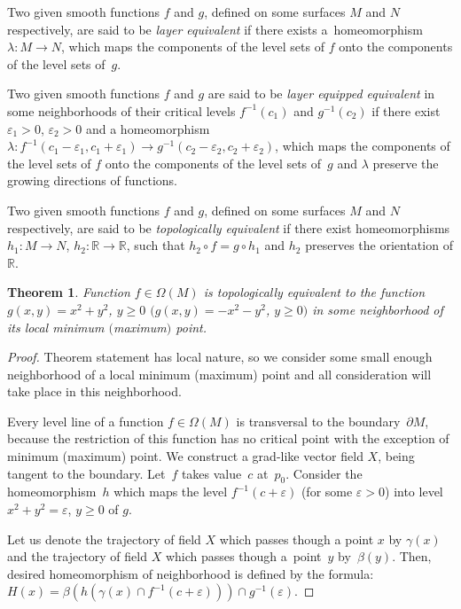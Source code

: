 \documentclass[pdftex]{sigma}
\numberwithin{equation}{section}
\newtheorem{Theorem}{Theorem}[section]
\begin{document}
\begin{Definition}\label{definition2.1}
Two given smooth functions $f$ and $g$, def\/ined on some surfaces $M$ and $N$ respectively, are said to be \emph{layer equivalent} if there exists a~homeomorphism $\lambda \colon M\rightarrow N$, which maps the components of the level sets of $f$ onto the components of the level sets of~$g$.
\end{Definition}

\begin{Definition}\label{definition2.2}
Two given smooth functions $f$ and $g$ are said to be \emph{layer equipped equivalent} in some neighborhoods of their critical levels $f^{-1}(c_{1})$ and $g^{-1}(c_{2})$ if there exist $\varepsilon_{1}>0$, $\varepsilon_{2}>0$ and a homeomorphism $\lambda \colon f^{-1}(c_{1}-\varepsilon_{1},c_{1}+\varepsilon_{1}) \rightarrow g^{-1}(c_{2}-\varepsilon_{2},c_{2}+\varepsilon_{2})$, which maps the components of the level sets of $f$ onto the components of the level sets of~$g$ and $\lambda$ preserve the growing directions of functions.
\end{Definition}

\begin{Definition}\label{definition2.3}
Two given smooth functions $f$ and $g$, def\/ined on some surfaces $M$ and $N$ respectively, are said to be \emph{topologically equivalent} if there exist homeomorphisms $h_1\colon M\rightarrow N$, $h_2\colon \mathbb{R}\rightarrow\mathbb{R}$, such that $h_2\circ f=g\circ h_1$ and $h_2$ preserves the orientation of $\mathbb{R}$.
\end{Definition}

\begin{Theorem}\label{theorem2.1}
Function $f\in\Omega(M)$ is topologically equivalent to the function $g(x,y)=x^{2}+y^{2}$, $y\geq0$ $(g(x,y)=-x^{2}-y^{2}$, $y\geq0)$ in some neighborhood of its local minimum $($maximum$)$ point.
\end{Theorem}

\begin{proof}
Theorem statement has local nature, so we consider some small enough neighborhood of a local minimum (maximum) point and all consideration will take place in this neighborhood.

Every level line of a function $f\in\Omega(M)$ is transversal to the boundary~$\partial M$, because the restriction of this function has no critical point with the exception of minimum (maximum) point. We construct a grad-like vector f\/ield $X$, being tangent to the boundary. Let~$f$ takes value~$c$ at~$p_{0}$. Consider the homeomorphism~$h$ which maps the level $f^{-1}(c+\varepsilon)$ (for some $\varepsilon>0$) into level $x^{2}+y^{2}=\varepsilon$, $y\geq0$ of $g$.

Let us denote the trajectory of f\/ield $X$ which passes though a point $x$ by $\gamma(x)$ and the trajectory of f\/ield $X$ which passes though a~point~$y$ by~$\beta(y)$. Then, desired homeomorphism of neighborhood is def\/ined by the formula: $H(x)=\beta(h(\gamma(x)\cap f^{-1}(c+\varepsilon)))\cap g^{-1}(\varepsilon)$.
\end{proof}
\end{document}
